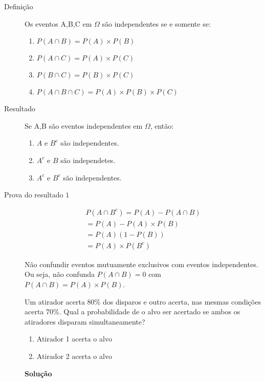 \begin{description}
  \begin{description}
    \item [Definição] Os eventos A,B,C em $\Omega$ são independentes se e somente se:

      \begin{enumerate}[label=(\alph*)]
        \item $P(A \cap B) = P(A)\times P(B)$ 

        \item $P(A \cap C) = P(A)\times P(C)$

        \item $P(B \cap C)= P(B)\times P(C)$

        \item $P(A \cap B \cap C)= P(A)\times P(B) \times P(C)$
      \end{enumerate}

    \item [Resultado] Se A,B são eventos independentes em $\Omega$, então:

      \begin{enumerate}
        \item $A$ e $B^c$ são independentes.
        \item $A^c$ e $B$ são independetes.
        \item $A^c$ e $B^c$ são independentes.
      \end{enumerate}
      \begin{figure}[H]
        \centering
        
        \label{fig:19}
      \end{figure}
    \item[Prova do resultado $1$]
      \begin{align*}
        P(A \cap B^{c})= P(A) - P(A \cap B)\\
        = P(A)-P(A)\times P(B)\\
        = P(A)(1-P(B))\\
        =P(A)\times P(B^{c})
      \end{align*}

     \begin{obs}
       Não confundir eventos mutuamente exclusivos com eventos independentes. Ou seja, não confunda $P(A \cap B)  = 0$ com $ P(A \cap B) = P(A)\times P(B)$.
      \end{obs}
      \begin{example}Um atirador acerta 80\% dos disparos e outro acerta, nas mesmas condições
        acerta 70\%. Qual a probabilidade de o alvo ser acertado se ambos os atiradores disparam simultaneamente?
        \begin{enumerate}[label=\Alph*:]
          \item  Atirador 1 acerta o alvo
          \item Atirador 2 acerta o alvo
        \end{enumerate}
        \textbf{Solução}


\end{example}
\end{description}
\end{description}
